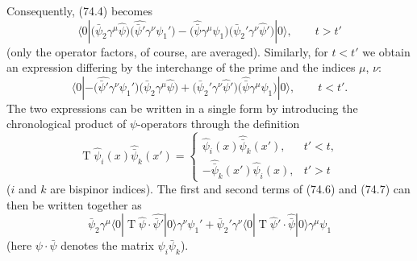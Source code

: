Consequently, (74.4) becomes
\begin{equation}
\langle0|\bigl(\bar\psi_2\gamma^\mu\hat\psi\bigr)
\bigl(\widehat{\bar\psi'}\gamma^\nu\psi_1'\bigr)
-\bigl(\widehat{\bar\psi}\gamma^\mu\psi_1\bigr)
\bigl(\bar\psi_2'\gamma^\nu\hat\psi'\bigr)|0\rangle,
\qquad t>t'
\tag{74.6}
\end{equation}
(only the operator factors, of course, are averaged). Similarly, for $t<t'$ we obtain an expression differing by the interchange of the prime and the indices $\mu$, $\nu$:
\begin{equation}
\langle0|-\bigl(\widehat{\bar\psi'}\gamma^\nu\psi_1'\bigr)
\bigl(\bar\psi_2\gamma^\mu\hat\psi\bigr)
+\bigl(\bar\psi_2'\gamma^\nu\hat\psi'\bigr)
\bigl(\widehat{\bar\psi}\gamma^\mu\psi_1\bigr)|0\rangle,
\qquad t<t'.
\tag{74.7}
\end{equation}
The two expressions can be written in a single form by introducing the chronological product of $\psi$-operators through the definition
\begin{equation}
\mathop{\mathrm T}\hat\psi_i(x)\widehat{\bar\psi}_k(x')=
\begin{cases}
\hat\psi_i(x)\widehat{\bar\psi}_k(x'),&t'<t,\\
-\widehat{\bar\psi}_k(x')\hat\psi_i(x),&t'>t
\end{cases}
\tag{74.8}
\end{equation}
($i$ and $k$ are bispinor indices). The first and second terms of (74.6) and (74.7) can then be written together as
\begin{equation}
\bar\psi_2\gamma^\mu\langle0|\mathop{\mathrm T}\hat\psi\cdot\widehat{\bar\psi'}|0\rangle\gamma^\nu\psi_1'
+\bar\psi_2'\gamma^\nu\langle0|\mathop{\mathrm T}\hat\psi'\cdot\widehat{\bar\psi}|0\rangle\gamma^\mu\psi_1
\tag{74.9}
\end{equation}
(here $\psi\cdot\bar\psi$ denotes the matrix $\psi_i\bar\psi_k$).

